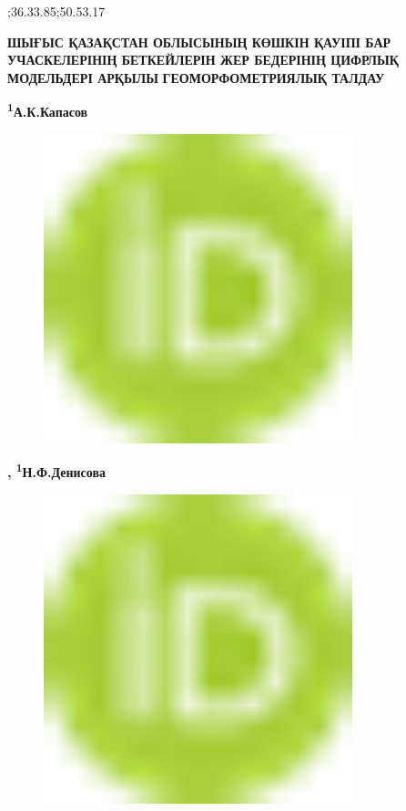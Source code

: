 ;36.33.85;50.53.17

{\bfseries ШЫҒЫС ҚАЗАҚСТАН ОБЛЫСЫНЫҢ КӨШКІН ҚАУІПІ БАР УЧАСКЕЛЕРІНІҢ
БЕТКЕЙЛЕРІН ЖЕР БЕДЕРІНІҢ ЦИФРЛЫҚ МОДЕЛЬДЕРІ АРҚЫЛЫ}
{\bfseries ГЕОМОРФОМЕТРИЯЛЫҚ ТАЛДАУ}

{\bfseries \textsuperscript{1}А.К.Капасов}
\begin{figure}[H]
	\centering
	\includegraphics[width=0.8\textwidth]{media/ict2/image1}
	\caption*{}
\end{figure}
{\bfseries ,
\textsuperscript{1}Н.Ф.Денисова}
\begin{figure}[H]
	\centering
	\includegraphics[width=0.8\textwidth]{media/ict2/image1}
	\caption*{}
\end{figure}
